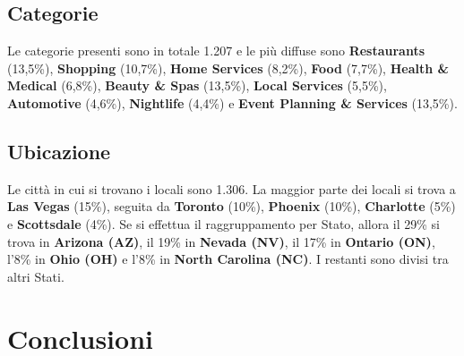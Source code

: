 \documentclass[12pt]{article}
\begin{document}
\subsection{Categorie}
Le categorie presenti sono in totale 1.207 e le più diffuse sono \textbf{Restaurants} (13,5\%), \textbf{Shopping} (10,7\%), \textbf{Home Services} (8,2\%), \textbf{Food} (7,7\%), \textbf{Health \& Medical} (6,8\%), \textbf{Beauty \& Spas} (13,5\%), \textbf{Local Services} (5,5\%), \textbf{Automotive} (4,6\%), \textbf{Nightlife} (4,4\%) e \textbf{Event Planning \& Services} (13,5\%).

\subsection{Ubicazione}
Le città in cui si trovano i locali sono 1.306. La maggior parte dei locali si trova a \textbf{Las Vegas} (15\%), seguita da \textbf{Toronto} (10\%), \textbf{Phoenix} (10\%), \textbf{Charlotte} (5\%) e \textbf{Scottsdale} (4\%).\newline
Se si effettua il raggruppamento per Stato, allora il 29\% si trova in \textbf{Arizona (AZ)}, il 19\% in \textbf{Nevada (NV)}, il 17\% in \textbf{Ontario (ON)}, l'8\% in \textbf{Ohio (OH)} e l'8\% in \textbf{North Carolina (NC)}. I restanti sono divisi tra altri Stati.

\section{Conclusioni}

\printbibliography[title={Riferimenti}]
\end{document}
